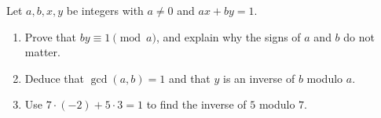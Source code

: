 Let $a,b,x,y$ be integers with $a\ne0$ and $ax+by=1$.
\begin{enumerate}
\item[(a)] Prove that $by\equiv1\pmod a$, and explain why the signs of $a$ and $b$ do not matter.
\item[(b)] Deduce that $\gcd(a,b)=1$ and that $y$ is an inverse of $b$ modulo $a$.
\item[(c)] Use $7\cdot(-2)+5\cdot3=1$ to find the inverse of $5$ modulo $7$.
\end{enumerate}
